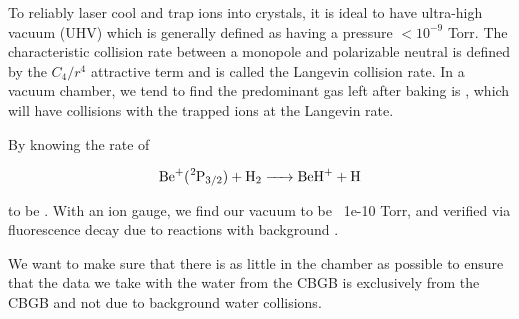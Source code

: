 To reliably laser cool and trap ions into crystals, it is ideal to have ultra-high vacuum (UHV) which is generally defined as having a pressure $<10^{-9}$ Torr. The characteristic collision rate between a monopole and polarizable neutral is defined by the $C_4/r^4$ attractive term and is called the Langevin collision rate. In a vacuum chamber, we tend to find the predominant gas left after baking is , which will have collisions with the trapped ions at the Langevin rate.

By knowing the rate of

\begin{equation}
	\ce{Be+(^2P3/2) + H2 -> BeH+ + H}
	\label{eq: Be+H2->BeH}
\end{equation}

to be \cite{Roth2006}. With an ion gauge, we find our vacuum to be ~1e-10 Torr, and verified via  fluorescence decay due to reactions with background .

We want to make sure that there is as little  in the chamber as possible to ensure that the data we take with the water from the CBGB is exclusively from the CBGB and not due to background water collisions.